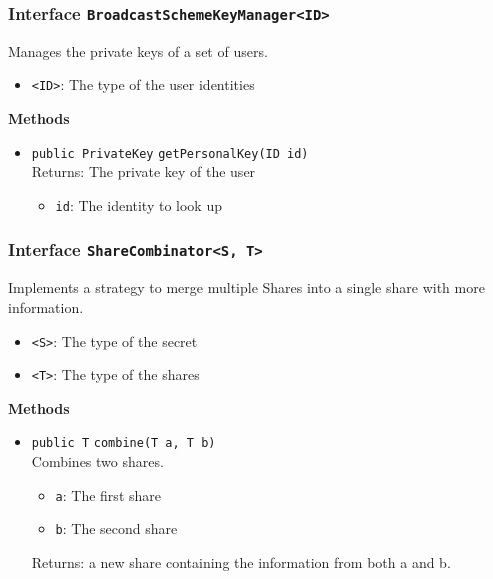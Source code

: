 \subsubsection{Interface \lstinline|BroadcastSchemeKeyManager<ID>|}
Manages the private keys of a set of users. \\


\begin{itemize}
\item \lstinline|<ID>|: The type of the user identities
\end{itemize}



\textbf{Methods}
\begin{itemize}
\item \lstinline|public PrivateKey| \lstinline|getPersonalKey|\lstinline|(ID id)|\\
Returns: The private key of the user
\begin{itemize}
\item \lstinline|id|: The identity to look up
\end{itemize}



\end{itemize}

\subsubsection{Interface \lstinline|ShareCombinator<S, T>|}
Implements a strategy to merge multiple Shares into a single share with
 more information. \\


\begin{itemize}
\item \lstinline|<S>|: The type of the secret
\item \lstinline|<T>|: The type of the shares
\end{itemize}



\textbf{Methods}
\begin{itemize}
\item \lstinline|public T| \lstinline|combine|\lstinline|(T a, T b)|\\
Combines two shares.
\begin{itemize}
\item \lstinline|a|: The first share
\item \lstinline|b|: The second share
\end{itemize}

Returns: a new share containing the information from both a and b.

\end{itemize}


